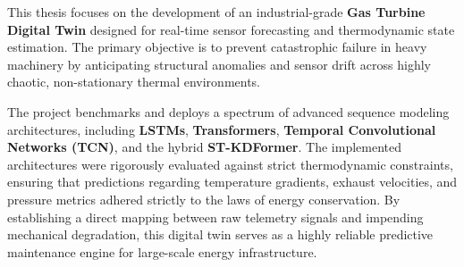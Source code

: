 \documentclass[11pt, a4paper]{article}
\begin{document}
This thesis focuses on the development of an industrial-grade \textbf{Gas Turbine Digital Twin} designed for real-time sensor forecasting and thermodynamic state estimation. The primary objective is to prevent catastrophic failure in heavy machinery by anticipating structural anomalies and sensor drift across highly chaotic, non-stationary thermal environments.

The project benchmarks and deploys a spectrum of advanced sequence modeling architectures, including \textbf{LSTMs}, \textbf{Transformers}, \textbf{Temporal Convolutional Networks (TCN)}, and the hybrid \textbf{ST-KDFormer}. The implemented architectures were rigorously evaluated against strict thermodynamic constraints, ensuring that predictions regarding temperature gradients, exhaust velocities, and pressure metrics adhered strictly to the laws of energy conservation. By establishing a direct mapping between raw telemetry signals and impending mechanical degradation, this digital twin serves as a highly reliable predictive maintenance engine for large-scale energy infrastructure.
\end{document}
